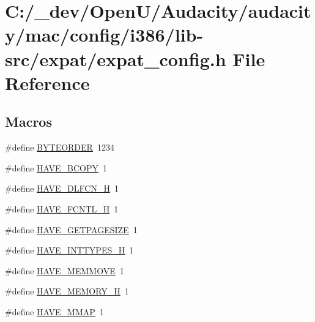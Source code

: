 \hypertarget{mac_2config_2i386_2lib-src_2expat_2expat__config_8h}{}\section{C\+:/\+\_\+dev/\+Open\+U/\+Audacity/audacity/mac/config/i386/lib-\/src/expat/expat\+\_\+config.h File Reference}
\label{mac_2config_2i386_2lib-src_2expat_2expat__config_8h}
\subsection*{Macros}
\begin{DoxyCompactItemize}
\item 
\#define \hyperlink{mac_2config_2i386_2lib-src_2expat_2expat__config_8h_a0c2fdec33260a22c7f28e1cc4d1de480}{B\+Y\+T\+E\+O\+R\+D\+ER}~1234
\item 
\#define \hyperlink{mac_2config_2i386_2lib-src_2expat_2expat__config_8h_aedb06b9a9fb649d9218d46247085c02c}{H\+A\+V\+E\+\_\+\+B\+C\+O\+PY}~1
\item 
\#define \hyperlink{mac_2config_2i386_2lib-src_2expat_2expat__config_8h_a0ee1617ff2f6885ef384a3dd46f9b9d7}{H\+A\+V\+E\+\_\+\+D\+L\+F\+C\+N\+\_\+H}~1
\item 
\#define \hyperlink{mac_2config_2i386_2lib-src_2expat_2expat__config_8h_a765d75020849aa0a9b6becd9a5b7a193}{H\+A\+V\+E\+\_\+\+F\+C\+N\+T\+L\+\_\+H}~1
\item 
\#define \hyperlink{mac_2config_2i386_2lib-src_2expat_2expat__config_8h_add281e88fe03de68eb6833a0f7832cbc}{H\+A\+V\+E\+\_\+\+G\+E\+T\+P\+A\+G\+E\+S\+I\+ZE}~1
\item 
\#define \hyperlink{mac_2config_2i386_2lib-src_2expat_2expat__config_8h_ab90a030ff2790ebdc176660a6dd2a478}{H\+A\+V\+E\+\_\+\+I\+N\+T\+T\+Y\+P\+E\+S\+\_\+H}~1
\item 
\#define \hyperlink{mac_2config_2i386_2lib-src_2expat_2expat__config_8h_a7b300f836d3d79d0d9b0039a6b842ded}{H\+A\+V\+E\+\_\+\+M\+E\+M\+M\+O\+VE}~1
\item 
\#define \hyperlink{mac_2config_2i386_2lib-src_2expat_2expat__config_8h_ae93a78f9d076138897af441c9f86f285}{H\+A\+V\+E\+\_\+\+M\+E\+M\+O\+R\+Y\+\_\+H}~1
\item 
\#define \hyperlink{mac_2config_2i386_2lib-src_2expat_2expat__config_8h_ac24e9c0562704d17896d14869e748fcc}{H\+A\+V\+E\+\_\+\+M\+M\+AP}~1

\end{DoxyCompactItemize}
